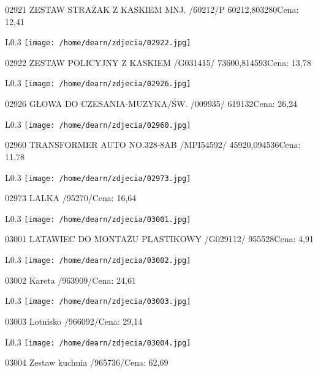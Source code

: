 02921 ZESTAW STRAŻAK Z KASKIEM MNJ. /60212/P    60212,803280Cena: 12,41\newline
\begin{wrapfigure}{L}{0.3\textwidth}
\texttt{[image: /home/dearn/zdjecia/02922.jpg]}
\end{wrapfigure}
02922 ZESTAW POLICYJNY Z KASKIEM /G031415/      73600,814593Cena: 13,78\newline
\begin{wrapfigure}{L}{0.3\textwidth}
\texttt{[image: /home/dearn/zdjecia/02926.jpg]}
\end{wrapfigure}
02926 GŁOWA DO CZESANIA-MUZYKA/ŚW. /009935/           619132Cena: 26,24\newline
\begin{wrapfigure}{L}{0.3\textwidth}
\texttt{[image: /home/dearn/zdjecia/02960.jpg]}
\end{wrapfigure}
02960 TRANSFORMER AUTO NO.328-8AB /MPI54592/    45920,094536Cena: 11,78\newline
\begin{wrapfigure}{L}{0.3\textwidth}
\texttt{[image: /home/dearn/zdjecia/02973.jpg]}
\end{wrapfigure}
02973 LALKA /95270/Cena: 16,64\newline
\begin{wrapfigure}{L}{0.3\textwidth}
\texttt{[image: /home/dearn/zdjecia/03001.jpg]}
\end{wrapfigure}
03001 LATAWIEC DO MONTAŻU PLASTIKOWY /G029112/        955528Cena: 4,91\newline
\begin{wrapfigure}{L}{0.3\textwidth}
\texttt{[image: /home/dearn/zdjecia/03002.jpg]}
\end{wrapfigure}
03002 Kareta /963909/Cena: 24,61\newline
\begin{wrapfigure}{L}{0.3\textwidth}
\texttt{[image: /home/dearn/zdjecia/03003.jpg]}
\end{wrapfigure}
03003 Lotnisko /966092/Cena: 29,14\newline
\begin{wrapfigure}{L}{0.3\textwidth}
\texttt{[image: /home/dearn/zdjecia/03004.jpg]}
\end{wrapfigure}
03004 Zestaw kuchnia /965736/Cena: 62,69\newline
